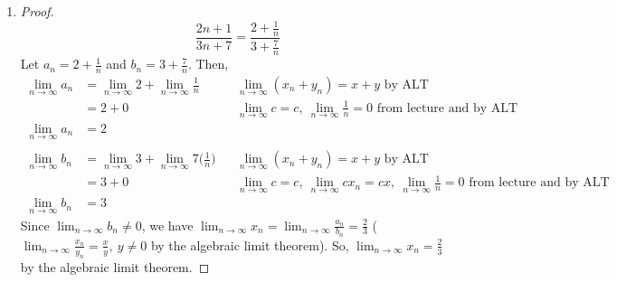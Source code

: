 \documentclass[13pt]{article}
\begin{document}
\begin{enumerate}[label=(\alph*)]
\item
  \begin{proof}
    \[\frac{2n + 1}{3n + 7} = \frac{2 + \frac{1}{n}}{3 + \frac{7}{n}}\]
    Let $a_n = 2 + \frac{1}{n}$ and $b_n = 3 + \frac{7}{n}$. Then,
    \begin{align*}
      \lim_{n \rightarrow \infty} a_n &= \lim_{n \rightarrow \infty} 2 +
                                        \lim_{n \rightarrow \infty}
                                        \frac{1}{n} && \lim_{n
                                                       \rightarrow
                                                       \infty} (x_n +
                                                       y_n) = x + y \text{ by ALT} \\
                                      &= 2 + 0 && \lim_{n \rightarrow \infty} c = c, \ \lim_{n
                                                  \rightarrow \infty} \frac{1}{n} = 0 \text{ from
                                                  lecture and by ALT} \\
      \lim_{n \rightarrow \infty} a_n &= 2 \\ \\
      \lim_{n \rightarrow \infty} b_n &= \lim_{n \rightarrow \infty} 3
                                        + \lim_{n \rightarrow \infty}
                                        7\bigg(\frac{1}{n}\bigg) && \lim_{n
                                                       \rightarrow
                                                       \infty} (x_n +
                                                       y_n) = x + y \text{ by ALT} \\
                                      &= 3 + 0 && \lim_{n \rightarrow
                                                  \infty} c = c, \
                                                  \lim_{n \rightarrow
                                                  \infty} cx_n = cx, \
                                                  \lim_{n \rightarrow
                                                  \infty} \frac{1}{n}
                                                  = 0 \text{ from
                                                  lecture and by ALT} \\
      \lim_{n \rightarrow \infty} b_n &= 3
    \end{align*}
    Since $\lim_{n \rightarrow \infty} b_n \neq 0$, we have $\lim_{n
      \rightarrow \infty} x_n = \lim_{n \rightarrow \infty}
    \frac{a_n}{b_n} = \frac{2}{3}$ ($\lim_{n \rightarrow \infty}
    \frac{x_n}{y_n} = \frac{x}{y}, \ y \neq 0$ by the algebraic limit
    theorem). So, $\lim_{n \rightarrow \infty} x_n = \frac{2}{3}$ by
    the algebraic limit theorem.
  \end{proof}
\end{enumerate}
\end{document}
